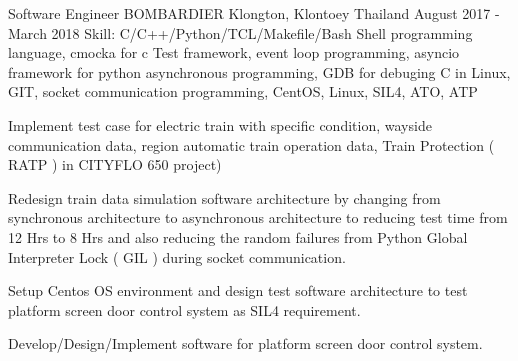 \begin{cventries}
  \cventry
    {Software Engineer} %
    {BOMBARDIER} %
    {Klongton, Klontoey Thailand} %
    {August 2017 - March 2018} %
    {Skill: C/C++/Python/TCL/Makefile/Bash Shell programming language, cmocka
    for c Test framework, event loop programming,
    asyncio framework for python asynchronous programming,
    GDB for debuging C in Linux, GIT, socket communication
    programming, CentOS, Linux, SIL4, ATO, ATP } %
    {
      \begin{cvitems} %
       \item {Implement test case for electric train with specific condition,
         wayside communication data, region automatic train operation data,
          Train Protection ( RATP ) in CITYFLO 650 project)}
       \item {Redesign train data simulation software architecture by changing
          from synchronous architecture to asynchronous architecture to reducing test
          time from 12 Hrs to 8 Hrs and also reducing the random failures from
          Python Global Interpreter Lock ( GIL ) during socket communication.}
       \item {Setup Centos OS environment and design test software architecture
       to test platform screen door control system as SIL4 requirement.}
       \item {Develop/Design/Implement software for platform screen door control
         system.}
      \end{cvitems}
    }


\end{cventries}
